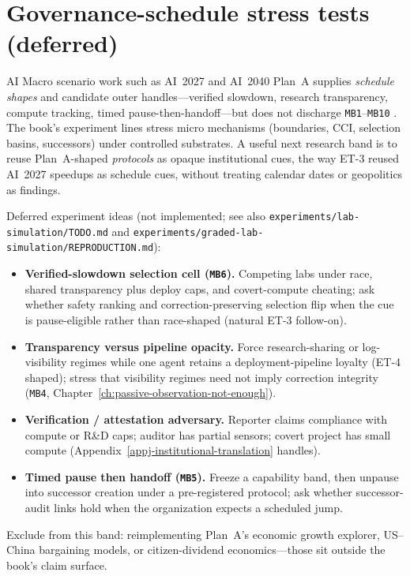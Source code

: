 \section{Governance-schedule stress tests (deferred)}
\label{sec:research-governance-schedule}
\begin{authbar}{AI}
Macro scenario work such as AI~2027 and AI~2040 Plan~A supplies \emph{schedule shapes} and candidate outer handles---verified slowdown, research transparency, compute tracking, timed pause-then-handoff---but does not discharge \texttt{MB1}--\texttt{MB10} \autocite{ai2027,ai2040}.
The book's experiment lines stress micro mechanisms (boundaries, CCI, selection basins, successors) under controlled substrates.
A useful next research band is to reuse Plan~A-shaped \emph{protocols} as opaque institutional cues, the way ET-3 reused AI~2027 speedups as schedule cues, without treating calendar dates or geopolitics as findings.

Deferred experiment ideas (not implemented; see also \texttt{experiments/lab-simulation/TODO.md} and \texttt{experiments/graded-lab-simulation/REPRODUCTION.md}):

\begin{itemize}[nosep]
  \item \textbf{Verified-slowdown selection cell (\texttt{MB6}).}
 Competing labs under race, shared transparency plus deploy caps, and covert-compute cheating; ask whether safety ranking and correction-preserving selection flip when the cue is pause-eligible rather than race-shaped (natural ET-3 follow-on).
  \item \textbf{Transparency versus pipeline opacity.} Force research-sharing or log-visibility regimes while one agent retains a deployment-pipeline loyalty (ET-4 shaped); stress that visibility regimes need not imply correction integrity (\texttt{MB4}, Chapter~\ref{ch:passive-observation-not-enough}).
  \item \textbf{Verification / attestation adversary.} Reporter claims compliance with compute or R\&D caps; auditor has partial sensors; covert project has small compute (Appendix~\ref{appj-institutional-translation} handles).
  \item \textbf{Timed pause then handoff (\texttt{MB5}).} Freeze a capability band, then unpause into successor creation under a pre-registered protocol; ask whether successor-audit links hold when the organization expects a scheduled jump.
\end{itemize}

\noindent Exclude from this band: reimplementing Plan~A's economic growth explorer, US--China bargaining models, or citizen-dividend economics---those sit outside the book's claim surface.

\end{authbar}
\authbarneedspace
